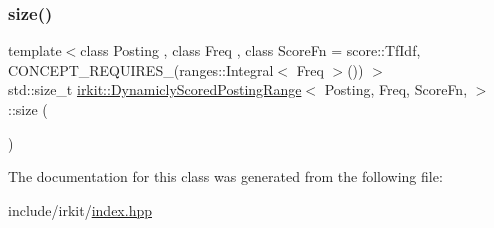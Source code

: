 \subsubsection{\texorpdfstring{size()}{size()}}
{\footnotesize\ttfamily template$<$class Posting , class Freq , class Score\+Fn  = score\+::\+Tf\+Idf, C\+O\+N\+C\+E\+P\+T\+\_\+\+R\+E\+Q\+U\+I\+R\+E\+S\+\_\+(ranges\+::\+Integral$<$ Freq $>$()) $>$ \\
std\+::size\+\_\+t \mbox{\hyperlink{classirkit_1_1DynamiclyScoredPostingRange}{irkit\+::\+Dynamicly\+Scored\+Posting\+Range}}$<$ Posting, Freq, Score\+Fn, $>$\+::size (\begin{DoxyParamCaption}{ }\end{DoxyParamCaption})\hspace{0.3cm}{\ttfamily [inline]}}



The documentation for this class was generated from the following file\+:\begin{DoxyCompactItemize}
\item 
include/irkit/\mbox{\hyperlink{irkit_2index_8hpp}{index.\+hpp}}\end{DoxyCompactItemize}
